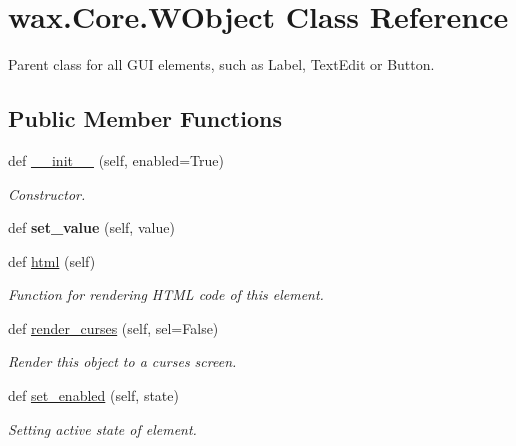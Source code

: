 \hypertarget{classwax_1_1Core_1_1WObject}{}\section{wax.\+Core.\+W\+Object Class Reference}
\label{classwax_1_1Core_1_1WObject}


Parent class for all G\+UI elements, such as Label, Text\+Edit or Button.  


\subsection*{Public Member Functions}
\begin{DoxyCompactItemize}
\item 
def \hyperlink{classwax_1_1Core_1_1WObject_ae6a315f847d25f16d9238af0a52adbdd}{\+\_\+\+\_\+init\+\_\+\+\_\+} (self, enabled=True)
\begin{DoxyCompactList}\small\item\em Constructor. \end{DoxyCompactList}\item 
def {\bfseries set\+\_\+value} (self, value)\hypertarget{classwax_1_1Core_1_1WObject_a92e17df52d239fb808a7dc35b993111b}{}\label{classwax_1_1Core_1_1WObject_a92e17df52d239fb808a7dc35b993111b}

\item 
def \hyperlink{classwax_1_1Core_1_1WObject_a41c9d6f3ac6431512b954df3afe8b521}{html} (self)
\begin{DoxyCompactList}\small\item\em Function for rendering H\+T\+ML code of this element. \end{DoxyCompactList}\item 
def \hyperlink{classwax_1_1Core_1_1WObject_a6b02871acf93de9352856b6f543dd4b1}{render\+\_\+curses} (self, sel=False)
\begin{DoxyCompactList}\small\item\em Render this object to a curses screen. \end{DoxyCompactList}\item 
def \hyperlink{classwax_1_1Core_1_1WObject_ac127564b44b2495ee987a4f6a61f01e1}{set\+\_\+enabled} (self, state)
\begin{DoxyCompactList}\small\item\em Setting active state of element. \end{DoxyCompactList}\end{DoxyCompactItemize}


